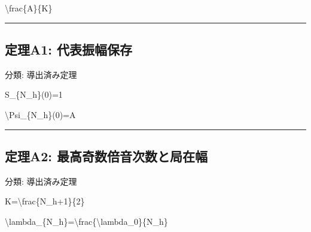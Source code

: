 \documentclass[
  a4paper]{ltjsarticle}
\newenvironment{Shaded}{}{}
\newcommand{\NormalTok}[1]{#1}
\begin{document}
\begin{Shaded}
\begin{Highlighting}[]
\NormalTok{\textbackslash{}frac\{A\}\{K\}}
\end{Highlighting}
\end{Shaded}

\begin{center}\rule{0.5\linewidth}{0.5pt}\end{center}

\subsection{定理A1:
代表振幅保存}\label{ux5b9aux7406a1-ux4ee3ux8868ux632fux5e45ux4fddux5b58}

分類: 導出済み定理

\begin{Shaded}
\begin{Highlighting}[]
\NormalTok{S\_\{N\_h\}(0)=1}
\end{Highlighting}
\end{Shaded}

\begin{Shaded}
\begin{Highlighting}[]
\NormalTok{\textbackslash{}Psi\_\{N\_h\}(0)=A}
\end{Highlighting}
\end{Shaded}

\begin{center}\rule{0.5\linewidth}{0.5pt}\end{center}

\subsection{定理A2:
最高奇数倍音次数と局在幅}\label{ux5b9aux7406a2-ux6700ux9ad8ux5947ux6570ux500dux97f3ux6b21ux6570ux3068ux5c40ux5728ux5e45}

分類: 導出済み定理

\begin{Shaded}
\begin{Highlighting}[]
\NormalTok{K=\textbackslash{}frac\{N\_h+1\}\{2\}}
\end{Highlighting}
\end{Shaded}

\begin{Shaded}
\begin{Highlighting}[]
\NormalTok{\textbackslash{}lambda\_\{N\_h\}=\textbackslash{}frac\{\textbackslash{}lambda\_0\}\{N\_h\}}
\end{Highlighting}
\end{Shaded}
\end{document}
